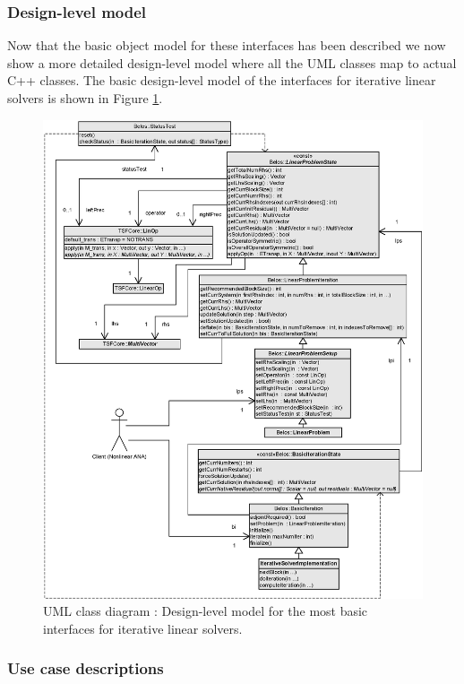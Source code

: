 \documentclass[pdf,ps2pdf,11pt]{SANDreport}
\begin{document}
\subsubsection{Design-level model}

Now that the basic object model for these interfaces has been
described we now show a more detailed design-level model where all the
UML classes map to actual C++ classes.  The basic design-level model
of the interfaces for iterative linear solvers is shown in Figure
{}\ref{belos:fig:BelosInterfaces}.

{\bsinglespace
\begin{figure}
\begin{center}
\includegraphics*[scale=0.72]{BelosInterfaces}
\end{center}
\caption{
\label{belos:fig:BelosInterfaces}
UML class diagram : Design-level model
for the most basic interfaces for iterative linear solvers.}
\end{figure}
\esinglespace}

\subsubsection{Use case descriptions}
\end{document}
